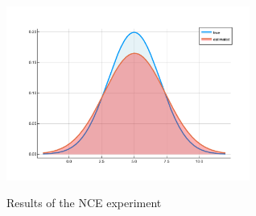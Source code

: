 \begin{example}
\begin{figure}[h]
	{{\includegraphics[width=8.0cm]{plots/Images/NCE_results.pdf} }}%
	\caption{Results of the NCE experiment}%
	\label{ggm}%
\end{figure}
\end{example}